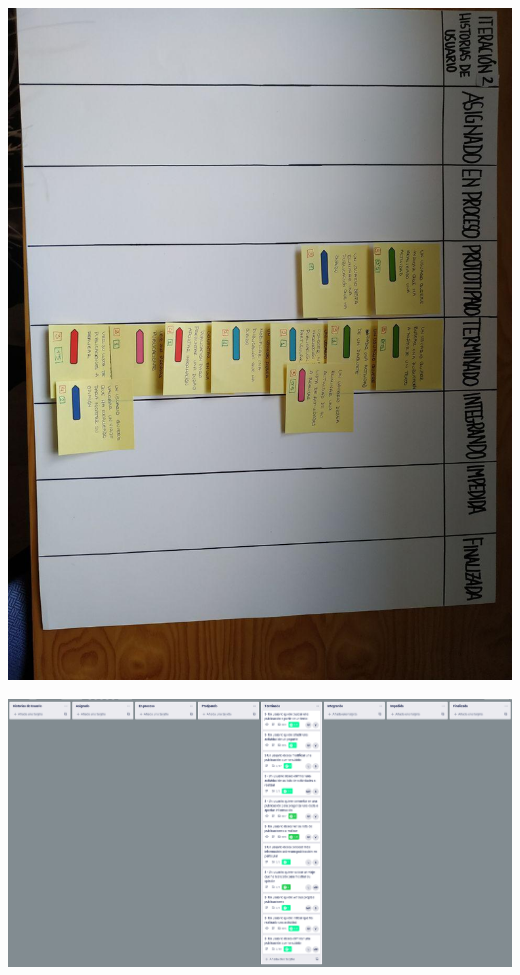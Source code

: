 \documentclass[spanish]{beamer}
\begin{document}
\begin{frame}
	\begin{center}
		\includegraphics[angle=90, scale=0.34]{papel2_6}
	\end{center}
\end{frame}

\begin{frame}
	\begin{center}
		\includegraphics[scale=0.295]{trello2_8}
	\end{center}
\end{frame}
\end{document}
